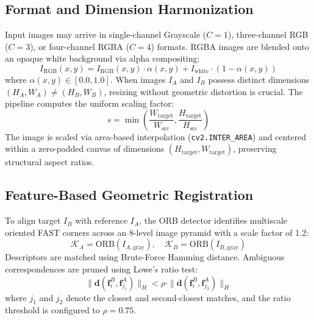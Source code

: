 \documentclass[conference]{IEEEtran}
\begin{document}
\subsection{Format and Dimension Harmonization}
Input images may arrive in single-channel Grayscale ($C=1$), three-channel RGB ($C=3$), or four-channel RGBA ($C=4$) formats. RGBA images are blended onto an opaque white background via alpha compositing:
\begin{equation}
I_{\text{RGB}}(x, y) = I_{\text{RGB}}(x, y) \cdot \alpha(x, y) + I_{\text{white}} \cdot (1 - \alpha(x, y))
\end{equation}
where $\alpha(x, y) \in [0.0, 1.0]$. When images $I_A$ and $I_B$ possess distinct dimensions $(H_A, W_A) \neq (H_B, W_B)$, resizing without geometric distortion is crucial. The pipeline computes the uniform scaling factor:
\begin{equation}
s = \min\left(\frac{W_{\text{target}}}{W_{\text{src}}}, \frac{H_{\text{target}}}{H_{\text{src}}}\right)
\end{equation}
The image is scaled via area-based interpolation (\texttt{cv2.INTER\_AREA}) and centered within a zero-padded canvas of dimensions $(H_{\text{target}}, W_{\text{target}})$, preserving structural aspect ratios.

\subsection{Feature-Based Geometric Registration}
To align target $I_B$ with reference $I_A$, the ORB detector identifies multiscale oriented FAST corners across an 8-level image pyramid with a scale factor of 1.2:
\begin{equation}
\mathcal{K}_A = \text{ORB}(I_{A,\text{gray}}), \quad \mathcal{K}_B = \text{ORB}(I_{B,\text{gray}})
\end{equation}
Descriptors are matched using Brute-Force Hamming distance. Ambiguous correspondences are pruned using Lowe's ratio test:
\begin{equation}
\|\mathbf{d}(\mathbf{f}_i^B, \mathbf{f}_{j_1}^A)\|_H < \rho \cdot \|\mathbf{d}(\mathbf{f}_i^B, \mathbf{f}_{j_2}^A)\|_H
\end{equation}
where $j_1$ and $j_2$ denote the closest and second-closest matches, and the ratio threshold is configured to $\rho = 0.75$.
\end{document}
